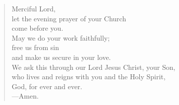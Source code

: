 \prayer

\setlength{\vleftmargin}{\prayerleftmargini}

\begin{verse}
Merciful Lord,\\
let the evening prayer of your Church\\
come before you.\\
May we do your work faithfully;\\
free us from sin\\
and make us secure in your love.\\
We ask this through our Lord Jesus Christ, your Son,\\
who lives and reigns with you and the Holy Spirit,\\
God, for ever and ever.\\
{\color{red}---\thinspace}Amen.
\end{verse}

\setlength{\vleftmargin}{\defleftmargini}